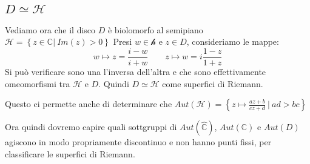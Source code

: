 \subsection {$D \simeq \mathcal{H}$}

Vediamo ora che il disco $D$ è biolomorfo al semipiano $\mathcal{H} = \left \{ z \in \mathbb{C} | \ Im (z)>0 \right \}$
Presi $w \in \mathcal{h}$ e $z \in D$, consideriamo le mappe:
$$w \mapsto z=\frac{i-w}{i+w} \qquad z \mapsto w= i\frac{1-z}{1+z}$$
Si può verificare sono una l'inversa dell'altra e che sono effettivamente omeomorfismi tra $\mathcal{H}$ e $D$.
Quindi $D \simeq \mathcal{H}$ come superfici di Riemann.

Questo ci permette anche di determinare che $Aut( \mathcal{H}) = \left \{ z \mapsto \displaystyle{\frac{az+b}{cz+d}} \ | \ ad>bc \right \}$

Ora quindi dovremo capire quali sottgruppi di $Aut (\hat{\mathbb{C}})$, $Aut(\mathbb{C})$ e $Aut(D)$ agiscono in modo propriamente discontinuo
e non hanno punti fissi, per classificare le superfici di Riemann.